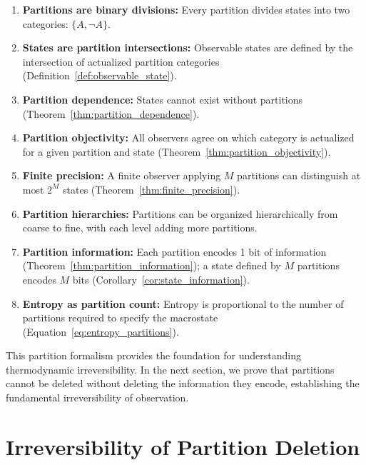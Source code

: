 \documentclass[twocolumn,10pt]{article}
\theoremstyle{definition}
\theoremstyle{remark}
\begin{document}
\begin{enumerate}
\item \textbf{Partitions are binary divisions:} Every partition divides states into two categories: $\{A, \neg A\}$.

\item \textbf{States are partition intersections:} Observable states are defined by the intersection of actualized partition categories (Definition~\ref{def:observable_state}).

\item \textbf{Partition dependence:} States cannot exist without partitions (Theorem~\ref{thm:partition_dependence}).

\item \textbf{Partition objectivity:} All observers agree on which category is actualized for a given partition and state (Theorem~\ref{thm:partition_objectivity}).

\item \textbf{Finite precision:} A finite observer applying $M$ partitions can distinguish at most $2^M$ states (Theorem~\ref{thm:finite_precision}).

\item \textbf{Partition hierarchies:} Partitions can be organized hierarchically from coarse to fine, with each level adding more partitions.

\item \textbf{Partition information:} Each partition encodes 1 bit of information (Theorem~\ref{thm:partition_information}); a state defined by $M$ partitions encodes $M$ bits (Corollary~\ref{cor:state_information}).

\item \textbf{Entropy as partition count:} Entropy is proportional to the number of partitions required to specify the macrostate (Equation~\ref{eq:entropy_partitions}).
\end{enumerate}

\noindent This partition formalism provides the foundation for understanding thermodynamic irreversibility. In the next section, we prove that partitions cannot be deleted without deleting the information they encode, establishing the fundamental irreversibility of observation.

\section{Irreversibility of Partition Deletion}
\label{sec:irreversibility}
\end{document}
